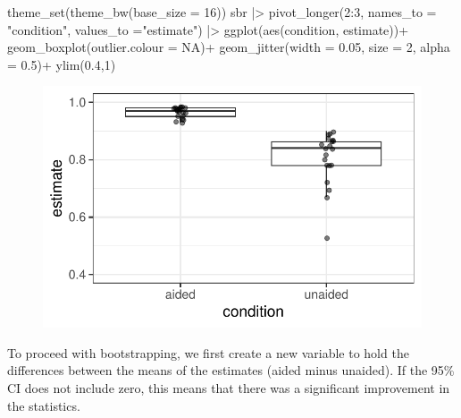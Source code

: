 \documentclass[
  letterpaper,
  DIV=11,
  numbers=noendperiod]{scrreprt}
\newenvironment{Shaded}{\begin{snugshade}}{\end{snugshade}}
\newcommand{\AttributeTok}[1]{\textcolor[rgb]{0.40,0.45,0.13}{#1}}
\newcommand{\ConstantTok}[1]{\textcolor[rgb]{0.56,0.35,0.01}{#1}}
\newcommand{\DecValTok}[1]{\textcolor[rgb]{0.68,0.00,0.00}{#1}}
\newcommand{\FloatTok}[1]{\textcolor[rgb]{0.68,0.00,0.00}{#1}}
\newcommand{\FunctionTok}[1]{\textcolor[rgb]{0.28,0.35,0.67}{#1}}
\newcommand{\NormalTok}[1]{\textcolor[rgb]{0.00,0.23,0.31}{#1}}
\newcommand{\SpecialCharTok}[1]{\textcolor[rgb]{0.37,0.37,0.37}{#1}}
\newcommand{\StringTok}[1]{\textcolor[rgb]{0.13,0.47,0.30}{#1}}
\begin{document}
\begin{Shaded}
\begin{Highlighting}[]
\FunctionTok{theme\_set}\NormalTok{(}\FunctionTok{theme\_bw}\NormalTok{(}\AttributeTok{base\_size =} \DecValTok{16}\NormalTok{))}
\NormalTok{sbr }\SpecialCharTok{|\textgreater{}} 
  \FunctionTok{pivot\_longer}\NormalTok{(}\DecValTok{2}\SpecialCharTok{:}\DecValTok{3}\NormalTok{, }\AttributeTok{names\_to =} \StringTok{"condition"}\NormalTok{, }\AttributeTok{values\_to =}\StringTok{"estimate"}\NormalTok{) }\SpecialCharTok{|\textgreater{}} 
  \FunctionTok{ggplot}\NormalTok{(}\FunctionTok{aes}\NormalTok{(condition, estimate))}\SpecialCharTok{+}
  \FunctionTok{geom\_boxplot}\NormalTok{(}\AttributeTok{outlier.colour =} \ConstantTok{NA}\NormalTok{)}\SpecialCharTok{+}
  \FunctionTok{geom\_jitter}\NormalTok{(}\AttributeTok{width =} \FloatTok{0.05}\NormalTok{, }\AttributeTok{size =} \DecValTok{2}\NormalTok{, }\AttributeTok{alpha =} \FloatTok{0.5}\NormalTok{)}\SpecialCharTok{+}
  \FunctionTok{ylim}\NormalTok{(}\FloatTok{0.4}\NormalTok{,}\DecValTok{1}\NormalTok{)}
\end{Highlighting}
\end{Shaded}

\begin{figure}[H]

{\centering \includegraphics{data-sads_files/figure-pdf/unnamed-chunk-4-1.pdf}

}

\end{figure}

To proceed with bootstrapping, we first create a new variable to hold
the differences between the means of the estimates (aided minus
unaided). If the 95\% CI does not include zero, this means that there
was a significant improvement in the statistics.
\end{document}
